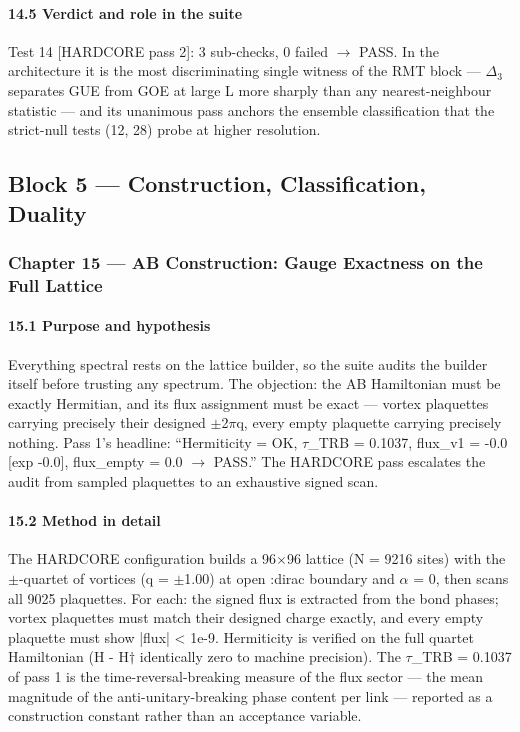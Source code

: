 \documentclass[10pt]{article}
\begin{document}
\paragraph{14.5 Verdict and role in the suite}

Test 14 [HARDCORE pass 2]: 3 sub-checks, 0 failed $\rightarrow$ PASS. In the architecture it is the most discriminating single witness of the RMT block --- $\Delta$$_3$ separates GUE from GOE at large L more sharply than any nearest-neighbour statistic --- and its unanimous pass anchors the ensemble classification that the strict-null tests (12, 28) probe at higher resolution.

\subsection{Block 5 --- Construction, Classification, Duality}

\subsubsection{Chapter 15 --- AB Construction: Gauge Exactness on the Full Lattice}

\paragraph{15.1 Purpose and hypothesis}

Everything spectral rests on the lattice builder, so the suite audits the builder itself before trusting any spectrum. The objection: the AB Hamiltonian must be exactly Hermitian, and its flux assignment must be exact --- vortex plaquettes carrying precisely their designed $\pm$2$\pi$q, every empty plaquette carrying precisely nothing. Pass 1's headline: ``Hermiticity = OK, $\tau$\_TRB = 0.1037, flux\_v1 = -0.0 [exp -0.0], flux\_empty = 0.0 $\rightarrow$ PASS.'' The HARDCORE pass escalates the audit from sampled plaquettes to an exhaustive signed scan.

\paragraph{15.2 Method in detail}

The HARDCORE configuration builds a 96$\times$96 lattice (N = 9216 sites) with the $\pm$-quartet of vortices (q = $\pm$1.00) at open :dirac boundary and $\alpha$ = 0, then scans all 9025 plaquettes. For each: the signed flux is extracted from the bond phases; vortex plaquettes must match their designed charge exactly, and every empty plaquette must show |flux| < 1e-9. Hermiticity is verified on the full quartet Hamiltonian (H - H$\dagger$ identically zero to machine precision). The $\tau$\_TRB = 0.1037 of pass 1 is the time-reversal-breaking measure of the flux sector --- the mean magnitude of the anti-unitary-breaking phase content per link --- reported as a construction constant rather than an acceptance variable.
\end{document}
